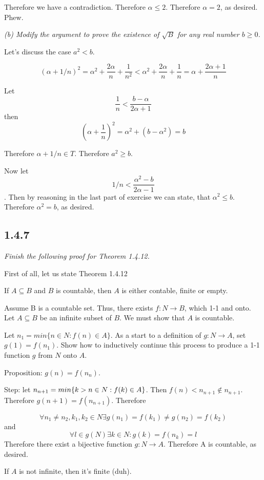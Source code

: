 \documentclass[11pt,oneside,titlepage]{book}
\begin{document}
Therefore we have a contradiction. Therefore $\alpha \leq 2$. Therefore
$\alpha = 2$, as desired. Phew.

\textit{(b) Modify the argument to prove the existence of $\sqrt{B}$ for any
  real number $b \geq 0$.}

Let's discuss the case  $a^2 < b$.

$$(\alpha + 1/n)^2 = \alpha^2 + \frac{2 \alpha}{n} + \frac{1}{n^2} <
\alpha ^2 + \frac{2 \alpha}{n} + \frac{1}{n} = \alpha + \frac{2 \alpha + 1}{n}
$$

Let 
$$\frac{1}{n} < \frac{b - \alpha}{2 \alpha + 1}$$
then 
$$(\alpha + \frac{1}{n})^2 = \alpha^2 + (b - \alpha^2) = b$$

Therefore $\alpha + 1/n \in T$. Therefore $a^2 \geq b$.

Now let $$1/n < \frac{\alpha^2 - b}{2 \alpha -  1}$$. Then by reasoning in
the last part of exercise we can state, that $\alpha^2 \leq b$. Therefore
$\alpha^2 = b$, as desired.

\subsection*{1.4.7}
\textit{Finish the following proof for Theorem 1.4.12.}

First of all, let us state Theorem 1.4.12

If $A \subseteq B$ and $B$ is countable, then $A$ is either contable, finite
or empty.

Assume B is a countable set. Thus, there exists $f: N \to B$, which 1-1 and
onto. Let $A \subseteq B$ be an infinite subset of $B$. We must show that $A$
is countable.

Let $n_1 = min\{n \in N: f(n) \in A\}$. As a start to a definition of
$g: N \to A$, set $g(1) = f(n_1)$. Show how to inductively continue this
process to produce a 1-1 function $g$ from $N$ onto $A$.

Proposition: $g(n) = f(n_n)$.

Step: let $n_{n + 1} = min\{k > n \in N: f(k) \in A\text\}$. Then $f(n) <
n_{n+ 1} \notin n_{n + 1}$. Therefore $g(n + 1) = f(n_{n + 1})$. Therefore

$$\forall n_1 \neq n_2, k_1, k_2 \in N \exists g(n_1) = f(k_1)  \neq g(n_2) =
f(k_2)$$
and
$$\forall l \in g(N) \exists k \in N: g(k) = f(n_k) = l$$
Therefore there exist a bijective function $g: N \to A$. Therefore A is
countable, as desired.

If $A$ is not infinite, then it's finite (duh).
\end{document}
